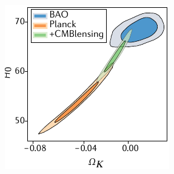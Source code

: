 \documentclass[aspectratio=169,handout]{beamer}
\begin{document}
\begin{frame}
\begin{columns}
        \includegraphics[width=\textwidth]{figures/nature5}
    \end{columns}

\end{frame}
\end{document}
